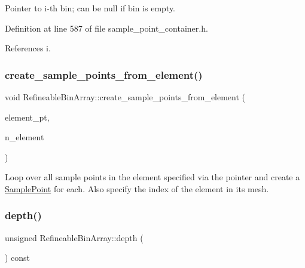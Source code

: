 Pointer to i-\/th bin; can be null if bin is empty. 



Definition at line 587 of file sample\+\_\+point\+\_\+container.\+h.



References i.

\mbox{\label{classRefineableBinArray_ac8f32afc025239c62a5d7e7e2535313e}} 
\subsubsection{\texorpdfstring{create\+\_\+sample\+\_\+points\+\_\+from\+\_\+element()}{create\_sample\_points\_from\_element()}}
{\footnotesize\ttfamily void Refineable\+Bin\+Array\+::create\+\_\+sample\+\_\+points\+\_\+from\+\_\+element (\begin{DoxyParamCaption}\item[{Finite\+Element $\ast$const}]{element\+\_\+pt,  }\item[{const unsigned \&}]{n\+\_\+element }\end{DoxyParamCaption})\hspace{0.3cm}{\ttfamily [private]}}



Loop over all sample points in the element specified via the pointer and create a \hyperlink{classSamplePoint}{Sample\+Point} for each. Also specify the index of the element in its mesh. 

\mbox{\label{classRefineableBinArray_a07632b2aa85958ed406ca980f0cd025b}} 
\subsubsection{\texorpdfstring{depth()}{depth()}}
{\footnotesize\ttfamily unsigned Refineable\+Bin\+Array\+::depth (\begin{DoxyParamCaption}{ }\end{DoxyParamCaption}) const\hspace{0.3cm}{\ttfamily [inline]}}



